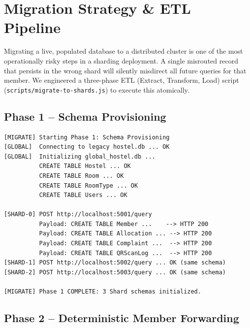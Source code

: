 \documentclass[sigconf]{acmart}
\begin{document}
\section{Migration Strategy \& ETL Pipeline}

Migrating a live, populated database to a distributed cluster is one of the most operationally risky steps in a sharding deployment. A single misrouted record that persists in the wrong shard will silently misdirect all future queries for that member. We engineered a three-phase ETL (Extract, Transform, Load) script (\texttt{scripts/migrate-to-shards.js}) to execute this atomically.

\subsection{Phase 1 -- Schema Provisioning}

\begin{lstlisting}[style=logstyle, caption={ETL Phase 1: Schema Bootstrap Trace}]
[MIGRATE] Starting Phase 1: Schema Provisioning
[GLOBAL]  Connecting to legacy hostel.db ... OK
[GLOBAL]  Initializing global_hostel.db ...
          CREATE TABLE Hostel ... OK
          CREATE TABLE Room ... OK
          CREATE TABLE RoomType ... OK
          CREATE TABLE Users ... OK

[SHARD-0] POST http://localhost:5001/query
          Payload: CREATE TABLE Member ...    --> HTTP 200
          Payload: CREATE TABLE Allocation ... --> HTTP 200
          Payload: CREATE TABLE Complaint ...  --> HTTP 200
          Payload: CREATE TABLE QRScanLog ...  --> HTTP 200
[SHARD-1] POST http://localhost:5002/query ... OK (same schema)
[SHARD-2] POST http://localhost:5003/query ... OK (same schema)

[MIGRATE] Phase 1 COMPLETE: 3 Shard schemas initialized.
\end{lstlisting}

\subsection{Phase 2 -- Deterministic Member Forwarding}
\end{document}
